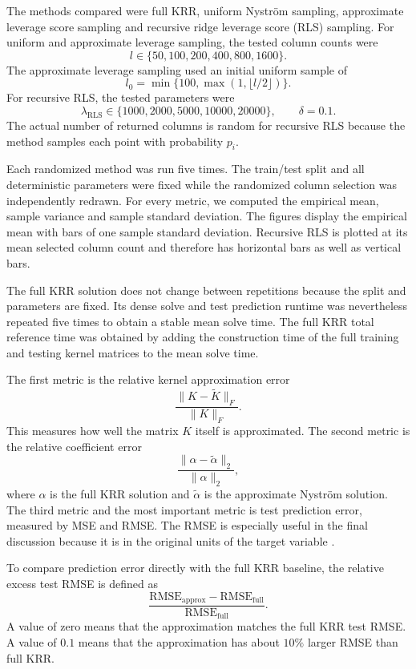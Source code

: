 The methods compared were full KRR, uniform Nystr\"om sampling, approximate leverage
score sampling and recursive ridge leverage score (RLS) sampling. For uniform and
approximate leverage sampling, the tested column counts were
\[
l\in\{50,100,200,400,800,1600\}.
\]
The approximate leverage sampling used an initial uniform sample of
\[
l_0=\min\{100,\max(1,\lfloor l/2\rfloor)\}.
\]
For recursive RLS, the tested parameters were
\[
\lambda_{\mathrm{RLS}}
\in\{1000,2000,5000,10000,20000\},
\qquad
\delta=0.1.
\]
The actual number of returned columns is random for recursive RLS because the method samples each point with probability $p_i$.

Each randomized method was run five times. The train/test split and all deterministic parameters were fixed while the randomized column selection was independently redrawn. For every metric, we computed the empirical mean, sample variance and sample standard deviation. The figures display the empirical mean with bars of one sample standard deviation. Recursive RLS is plotted at its mean selected column count and therefore has horizontal bars as well as vertical bars.

The full KRR solution does not change between repetitions because the split and parameters are fixed. Its dense solve and test prediction runtime was nevertheless repeated five times to obtain a stable mean solve time. The full KRR total reference time was obtained by adding the construction time of the full training and testing kernel matrices to the mean solve time.

The first metric is the relative kernel approximation error
\[
\frac{\|K-\tilde K\|_F}{\|K\|_F}.
\]
This measures how well the matrix $K$ itself is approximated. The second metric is the relative coefficient error
\[
\frac{\|\alpha-\tilde\alpha\|_2}{\|\alpha\|_2},
\]
where $\alpha$ is the full KRR solution and $\tilde\alpha$ is the approximate Nystr\"om solution. The third metric and the most important metric is test prediction error, measured by MSE and RMSE. The RMSE is especially useful in the final discussion because it is in the original units of the target variable \citep{cortes2010impact}.

To compare prediction error directly with the full KRR baseline, the relative excess test RMSE is defined as
\[
\frac{\mathrm{RMSE}_{\mathrm{approx}}-\mathrm{RMSE}_{\mathrm{full}}}{\mathrm{RMSE}_{\mathrm{full}}}.
\]
A value of zero means that the approximation matches the full KRR test RMSE. A value of $0.1$ means that the approximation has about $10\%$ larger RMSE than full KRR.

